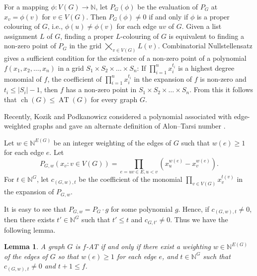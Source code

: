 \documentclass[11pt,a4paper]{article}
\newtheorem{lem}{Lemma}
\theoremstyle{definition}
\begin{document}
For a mapping $\phi: V(G) \to \mathbb{N}$, let $P_G(\phi)$ be the evaluation of $P_G$ at $x_v = \phi(v)$ for $v \in V(G)$. Then $P_G(\phi) \ne 0$ if and only if $\phi$ is a proper colouring of $G$, i.e., $\phi(u) \ne \phi(v)$ for each edge $uv$ of $G$. Given a list assignment $L$ of $G$, finding a proper $L$-colouring of $G$ is equivalent to finding a non-zero point of $P_G$ in the grid $ \bigtimes_{v \in V(G)} L(v)$. Combinatorial Nullstellensatz \cite{AT} gives a sufficient condition for the existence of a non-zero point of a polynomial $f(x_1,x_2,\ldots,x_n)$ in a grid $S_1 \times S_2 \times \ldots \times S_n$: If $\prod_{i=1}^n x_i^{t_i}$ is a highest degree monomial of $f$,   the coefficient   of $\prod_{i=1}^n x_i^{t_i}$
in the expansion of $f$ is non-zero and $t_i \le |S_i|-1$, then $f$ has a non-zero point   in   $S_1 \times S_2 \times \ldots \times S_n$. From this it follows that $\operatorname{ch}(G) \le \operatorname{AT}(G)$ for every graph $G$. 

Recently, Kozik and Podkanowicz considered a polynomial associated with edge-weighted graphs and gave an alternate definition of Alon--Tarsi number \cite{kozik}.

Let $w \in \mathbb{N}^{E(G)}$ be an integer weighting of the edges of $G$ such that $w(e) \ge 1$ for each edge $e$. Let $$P_{G,w}(x_v: v \in V(G)) = \prod_{e=uv \in E, u< v}(x_u^{w(e)} - x_v^{w(e)}).$$ 
For $t \in \mathbb{N}^G$, let $c_{(G,w),t}$ be the coefficient of the monomial $\prod_{v \in V(G)}x_v^{t(v)}$ in the expansion of $P_{G,w}$. 

It is easy to see that $P_{G,w} = P_G \cdot g$ for some polynomial $g$. Hence, if $c_{(G,w),t} \ne 0$, then there exists $t' \in \mathbb{N}^G$ such that $t' \le t$ and $c_{G,t'} \ne 0$. Thus we have the following lemma.

\begin{lem}
    \label{lem-AT}
    A graph $G$ is $f$-AT if and only if there exist a weighting $w \in \mathbb{N}^{E(G)}$  of the edges of $G$ so that $w(e) \ge 1$ for each edge $e$, and $t \in \mathbb{N}^G$ such that $c_{(G,w),t} \ne 0$ and $t+1 \le f$. 
\end{lem}  
\end{document}
